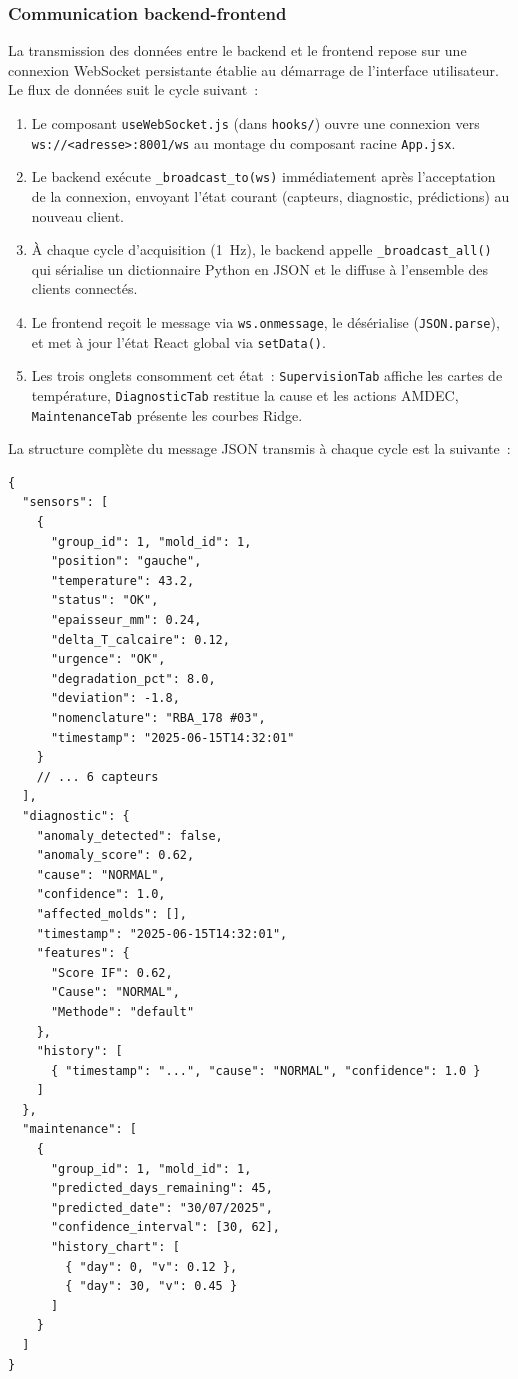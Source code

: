 \subsubsection{Communication backend-frontend}

La transmission des données entre le backend et le frontend repose sur une connexion WebSocket persistante établie au démarrage de l'interface utilisateur. Le flux de données suit le cycle suivant~:

\begin{enumerate}
  \item Le composant \texttt{useWebSocket.js} (dans \texttt{hooks/}) ouvre une connexion vers \texttt{ws://<adresse>:8001/ws} au montage du composant racine \texttt{App.jsx}.
  \item Le backend exécute \texttt{\_broadcast\_to(ws)} immédiatement après l'acceptation de la connexion, envoyant l'état courant (capteurs, diagnostic, prédictions) au nouveau client.
  \item À chaque cycle d'acquisition (1~Hz), le backend appelle \texttt{\_broadcast\_all()} qui sérialise un dictionnaire Python en JSON et le diffuse à l'ensemble des clients connectés.
  \item Le frontend reçoit le message via \texttt{ws.onmessage}, le désérialise (\texttt{JSON.parse}), et met à jour l'état React global via \texttt{setData()}.
  \item Les trois onglets consomment cet état~: \texttt{SupervisionTab} affiche les cartes de température, \texttt{DiagnosticTab} restitue la cause et les actions AMDEC, \texttt{MaintenanceTab} présente les courbes Ridge.
\end{enumerate}

La structure complète du message JSON transmis à chaque cycle est la suivante~:

\begin{verbatim}
{
  "sensors": [
    {
      "group_id": 1, "mold_id": 1,
      "position": "gauche",
      "temperature": 43.2,
      "status": "OK",
      "epaisseur_mm": 0.24,
      "delta_T_calcaire": 0.12,
      "urgence": "OK",
      "degradation_pct": 8.0,
      "deviation": -1.8,
      "nomenclature": "RBA_178 #03",
      "timestamp": "2025-06-15T14:32:01"
    }
    // ... 6 capteurs
  ],
  "diagnostic": {
    "anomaly_detected": false,
    "anomaly_score": 0.62,
    "cause": "NORMAL",
    "confidence": 1.0,
    "affected_molds": [],
    "timestamp": "2025-06-15T14:32:01",
    "features": {
      "Score IF": 0.62,
      "Cause": "NORMAL",
      "Methode": "default"
    },
    "history": [
      { "timestamp": "...", "cause": "NORMAL", "confidence": 1.0 }
    ]
  },
  "maintenance": [
    {
      "group_id": 1, "mold_id": 1,
      "predicted_days_remaining": 45,
      "predicted_date": "30/07/2025",
      "confidence_interval": [30, 62],
      "history_chart": [
        { "day": 0, "v": 0.12 },
        { "day": 30, "v": 0.45 }
      ]
    }
  ]
}
\end{verbatim}

